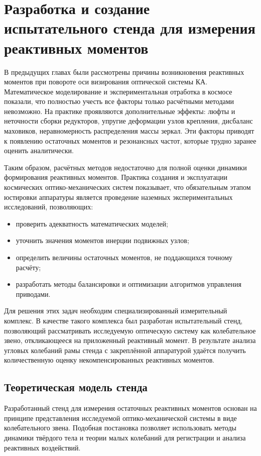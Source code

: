 \chapter{Разработка и создание испытательного стенда для измерения реактивных моментов}\label{ch:ch3}

В предыдущих главах были рассмотрены причины возникновения реактивных моментов при повороте оси визирования оптической системы КА. Математическое моделирование и экспериментальная отработка в космосе показали, что полностью учесть все факторы только расчётными методами невозможно. На практике проявляются дополнительные эффекты: люфты и неточности сборки редукторов, упругие деформации узлов крепления, дисбаланс маховиков, неравномерность распределения массы зеркал. Эти факторы приводят к появлению остаточных моментов и резонансных частот, которые трудно заранее оценить аналитически.

Таким образом, расчётных методов недостаточно для полной оценки динамики формирования реактивных моментов. Практика создания и эксплуатации космических оптико-механических систем показывает, что обязательным этапом юстировки аппаратуры является проведение наземных экспериментальных исследований, позволяющих:

\begin{itemize}
	\item проверить адекватность математических моделей;
	\item уточнить значения моментов инерции подвижных узлов;
	\item определить величины остаточных моментов, не поддающихся точному расчёту;
	\item разработать методы балансировки и оптимизации алгоритмов управления приводами.
\end{itemize}
	
Для решения этих задач необходим специализированный измерительный комплекс. В качестве такого комплекса был разработан испытательный стенд, позволяющий рассматривать исследуемую оптическую систему как колебательное звено, откликающееся на приложенный реактивный момент. В результате анализа угловых колебаний рамы стенда с закреплённой аппаратурой удаётся получить количественную оценку некомпенсированных реактивных моментов.

\section{Теоретическая модель стенда}

Разработанный стенд для измерения остаточных реактивных моментов основан на принципе представления исследуемой оптико-механической системы в виде колебательного звена. Подобная постановка позволяет использовать методы динамики твёрдого тела и теории малых колебаний для регистрации и анализа реактивных воздействий.

